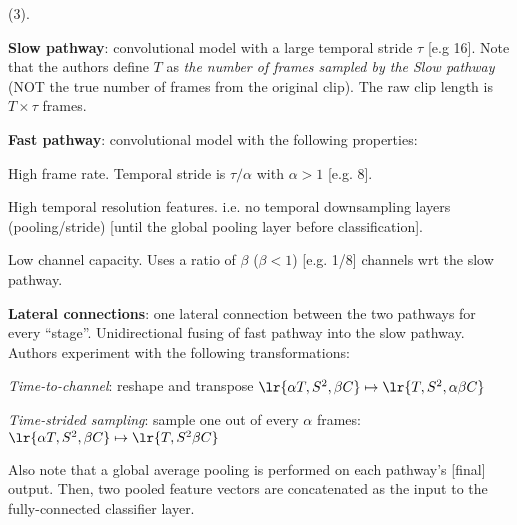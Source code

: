 \documentclass[11pt]{article}
\begin{document}
 (3). 
\begin{compactitem}
	\item \textbf{Slow pathway}: convolutional model with a large temporal stride $\tau$ [e.g 16]. Note that the authors define $T$ as \textit{the number of frames sampled by the Slow pathway} (NOT the true number of frames from the original clip). The raw clip length is $T \times \tau$ frames. 
	
	\item \textbf{Fast pathway}: convolutional model with the following properties:
	\begin{compactitem}
		\item High frame rate. Temporal stride is $\tau / \alpha$ with $\alpha > 1$ [e.g. 8]. 
		\item High temporal resolution features. i.e. no temporal downsampling layers (pooling/stride) [until the global pooling layer before classification].
		\item Low channel capacity. Uses a ratio of $\beta$ ($\beta < 1$) [e.g. 1/8] channels wrt the slow pathway.  
	\end{compactitem}

	\item \textbf{Lateral connections}: one lateral connection between the two pathways for every ``stage''. Unidirectional fusing of fast pathway into the slow pathway.  Authors experiment with the following transformations:
	\begin{compactitem}
		\item \textit{Time-to-channel}: reshape and transpose $\lr{\alpha T, S^2, \beta C} \mapsto \lr{ T, S^2, \alpha \beta C }$
		\item \textit{Time-strided sampling}: sample one out of every $\alpha$ frames:  $\lr{\alpha T, S^2, \beta C} \mapsto \lr{ T, S^2 \beta C }$
	\end{compactitem}
\end{compactitem}
Also note that a global average pooling is performed on each pathway's [final] output. Then, two pooled feature vectors are concatenated as the input to the fully-connected classifier layer. 







\end{document}
